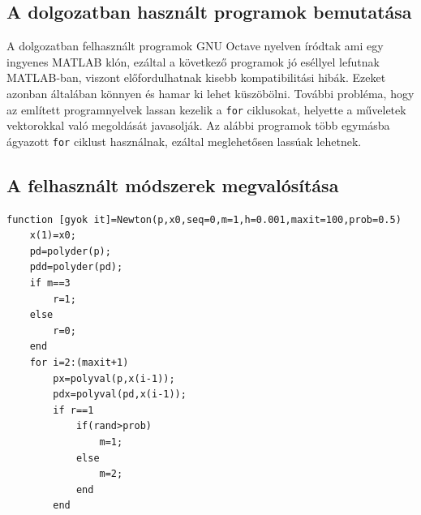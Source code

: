 \documentclass[a4paper,12pt]{report}
\begin{document}
\begin{appendices}












	\chapter{A dolgozatban használt programok bemutatása} \label{Appendix}
		A dolgozatban felhasznált programok GNU Octave nyelven íródtak ami egy ingyenes MATLAB klón, ezáltal a következő programok jó eséllyel lefutnak MATLAB-ban, viszont előfordulhatnak kisebb kompatibilitási hibák. Ezeket azonban általában könnyen és hamar ki lehet küszöbölni. További probléma, hogy az említett programnyelvek lassan kezelik a \texttt{for} ciklusokat, helyette a műveletek vektorokkal való megoldását javasolják. Az alábbi programok több egymásba ágyazott \texttt{for} ciklust használnak, ezáltal meglehetősen lassúak lehetnek.































		\section{A felhasznált módszerek megvalósítása} \label{Newton}
			\begin{singlespace}
            \begin{lstlisting}[caption=Newton.m]
function [gyok it]=Newton(p,x0,seq=0,m=1,h=0.001,maxit=100,prob=0.5)
    x(1)=x0;
    pd=polyder(p);
    pdd=polyder(pd);
    if m==3
        r=1;
    else
        r=0;
    end
    for i=2:(maxit+1)
        px=polyval(p,x(i-1));
        pdx=polyval(pd,x(i-1));
        if r==1
            if(rand>prob)
                m=1;
            else
                m=2;
            end
        end


\end{lstlisting}
\end{singlespace}
\end{appendices}
\end{document}
